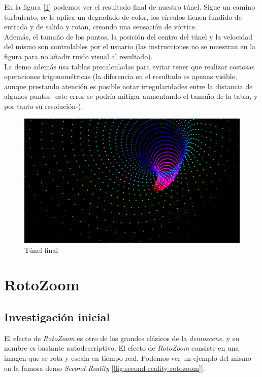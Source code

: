 En la figura [\ref{fig:finaltunnel}] podemos ver el resultado final de nuestro túnel. Sigue un camino turbulento, se le aplica un degradado de color, los círculos tienen fundido de entrada y de salida y rotan, creando una sensación de vórtice.\\

Además, el tamaño de los puntos, la posición del centro del túnel y la velocidad del mismo son controlables por el usuario (las instrucciones no se muestran en la figura para no añadir ruido visual al resultado).\\
 
La demo además usa tablas precalculadas para evitar tener que realizar costosas operaciones trigonométricas (la diferencia en el resultado es apenas visible, aunque prestando atención es posible notar irregularidades entre la distancia de algunos puntos -este error se podría mitigar aumentando el tamaño de la tabla, y por tanto su resolución-). 

\begin{figure}[h]
	\centering
	\includegraphics[width=12cm]{archivos/finaltunnel}
	\caption{Túnel final}
	\label{fig:finaltunnel}
\end{figure}

\section{RotoZoom}

\subsection{Investigación inicial}

El efecto de \emph{RotoZoom} es otro de los grandes clásicos de la \emph{demoscene}, y su nombre es bastante autodescriptivo. El efecto de \emph{RotoZoom} consiste en una imagen que se rota y escala en tiempo real. Podemos ver un ejemplo del mismo en la famosa demo \emph{Second Reality} [\ref{fig:second-reality-rotozoom}].\\

